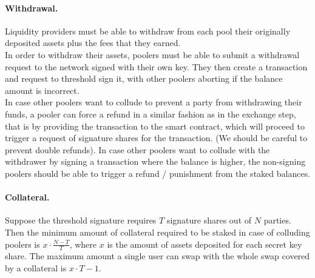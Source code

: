 \paragraph*{Withdrawal.}
Liquidity providers must be able to withdraw from each pool their originally deposited assets plus the fees that they earned.  \\
In order to withdraw their assets, poolers must be able to submit a withdrawal request to the network signed with their own key. They then create a transaction and request to threshold sign it, with other poolers aborting if the balance amount is incorrect. \\
In case other poolers want to collude to prevent a party from withdrawing their funds, a pooler can force a refund in a similar fashion as in the exchange step, that is by providing the transaction to the smart contract, which will proceed to trigger a request of signature shares for the transaction. (We should be careful to prevent double refunds).
In case other poolers want to collude with the withdrawer by signing a transaction where the balance is higher, the non-signing poolers should be able to trigger a refund / punishment from the staked balances.
\paragraph*{Collateral.}
Suppose the threshold signature requires $T$ signature shares out of $N$ parties. Then the minimum amount of collateral required to be staked in case of colluding poolers is $x \cdot \frac{N-T}{T}$, where $x$ is the amount of assets deposited for each secret key share.
The maximum amount a single user can swap with the whole swap covered by a collateral is $x \cdot T-1$.
